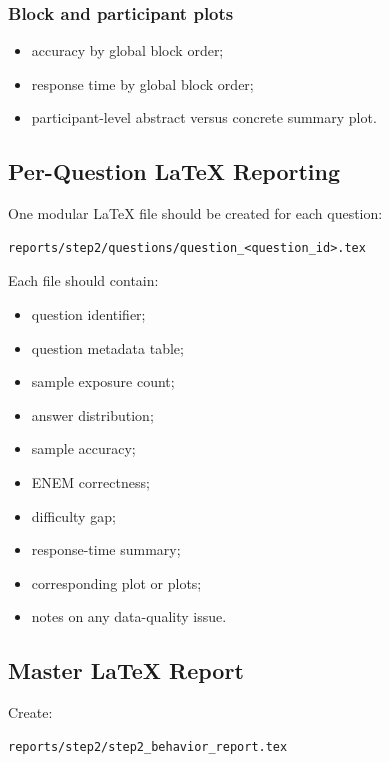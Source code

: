 \documentclass[11pt]{article}
\begin{document}
\subsubsection*{Block and participant plots}
\begin{itemize}
    \item accuracy by global block order;
    \item response time by global block order;
    \item participant-level abstract versus concrete summary plot.
\end{itemize}

\subsection{Per-Question \LaTeX{} Reporting}
One modular \LaTeX{} file should be created for each question:
\begin{verbatim}
reports/step2/questions/question_<question_id>.tex
\end{verbatim}

Each file should contain:
\begin{itemize}
    \item question identifier;
    \item question metadata table;
    \item sample exposure count;
    \item answer distribution;
    \item sample accuracy;
    \item ENEM correctness;
    \item difficulty gap;
    \item response-time summary;
    \item corresponding plot or plots;
    \item notes on any data-quality issue.
\end{itemize}

\subsection{Master \LaTeX{} Report}
Create:
\begin{verbatim}
reports/step2/step2_behavior_report.tex
\end{verbatim}
\end{document}
